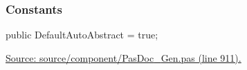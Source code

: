 \documentclass{report}
\newif\ifpdf
\begin{document}
\subsubsection*{\large{\textbf{Constants}}\normalsize\hspace{1ex}\hfill}
\begin{list}{}{
\setlength{\itemindent}{0cm}
\setlength{\listparindent}{0cm}
\setlength{\leftmargin}{\evensidemargin}
\addtolength{\leftmargin}{\tmplength}
\settowidth{\labelsep}{X}
\addtolength{\leftmargin}{\labelsep}
\setlength{\labelwidth}{\tmplength}
}
\label{PasDoc_Gen.TDocGenerator-DefaultAutoAbstract}
\item[\textbf{DefaultAutoAbstract}\hfill]
\ifpdf
\begin{flushleft}
\fi
\begin{ttfamily}
public DefaultAutoAbstract = true;\end{ttfamily}

\ifpdf
\end{flushleft}
\fi


\par  \par
\href{https://github.com/pasdoc/pasdoc/blob/master/source/component/PasDoc_Gen.pas#L911}{Source: source/component/PasDoc{\_}Gen.pas (line 911).}\end{list}
\end{document}
